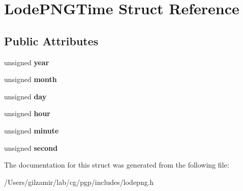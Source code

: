 \hypertarget{struct_lode_p_n_g_time}{}\section{Lode\+P\+N\+G\+Time Struct Reference}
\label{struct_lode_p_n_g_time}
\subsection*{Public Attributes}
\begin{DoxyCompactItemize}
\item 
\mbox{\label{struct_lode_p_n_g_time_a32b68342f39f3d38ba91a721b1149b8f}} 
unsigned {\bfseries year}
\item 
\mbox{\label{struct_lode_p_n_g_time_a295d890e862d5cd0c444e9d3a96fa9d5}} 
unsigned {\bfseries month}
\item 
\mbox{\label{struct_lode_p_n_g_time_aa3dee3b7b3a1e730fbded7a7b8cf355e}} 
unsigned {\bfseries day}
\item 
\mbox{\label{struct_lode_p_n_g_time_ac99cb7f3ce16a85f9f505b7f5f6e0aa7}} 
unsigned {\bfseries hour}
\item 
\mbox{\label{struct_lode_p_n_g_time_ac3045de79728f29fc61f534b062e0f13}} 
unsigned {\bfseries minute}
\item 
\mbox{\label{struct_lode_p_n_g_time_a6c691c5821e828488a8bb8a90751a2f0}} 
unsigned {\bfseries second}
\end{DoxyCompactItemize}


The documentation for this struct was generated from the following file\+:\begin{DoxyCompactItemize}
\item 
/\+Users/gilzamir/lab/cg/pgp/includes/lodepng.\+h\end{DoxyCompactItemize}
